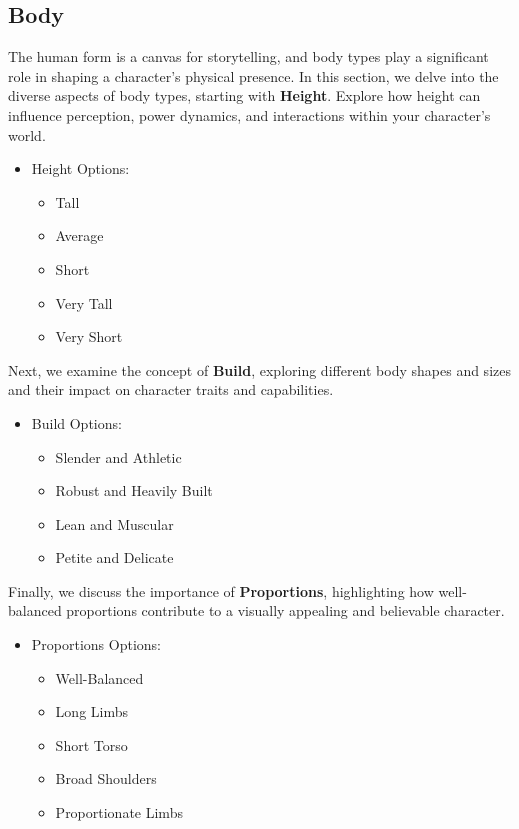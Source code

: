 \documentclass[12pt]{book}
\begin{document}
\subsection{\textbf{Body}}

The human form is a canvas for storytelling, and body types play a significant role in shaping a character's physical presence. In this section, we delve into the diverse aspects of body types, starting with \textbf{Height}. Explore how height can influence perception, power dynamics, and interactions within your character's world.

\begin{itemize}
    \item Height Options:
    \begin{itemize}
        \item Tall
        \item Average
        \item Short
        \item Very Tall
        \item Very Short
    \end{itemize}
\end{itemize}

Next, we examine the concept of \textbf{Build}, exploring different body shapes and sizes and their impact on character traits and capabilities.

\begin{itemize}
    \item Build Options:
    \begin{itemize}
        \item Slender and Athletic
        \item Robust and Heavily Built
        \item Lean and Muscular
        \item Petite and Delicate
    \end{itemize}
\end{itemize}

Finally, we discuss the importance of \textbf{Proportions}, highlighting how well-balanced proportions contribute to a visually appealing and believable character.

\begin{itemize}
    \item Proportions Options:
    \begin{itemize}
        \item Well-Balanced
        \item Long Limbs
        \item Short Torso
        \item Broad Shoulders
        \item Proportionate Limbs
    \end{itemize}
\end{itemize}
\end{document}
